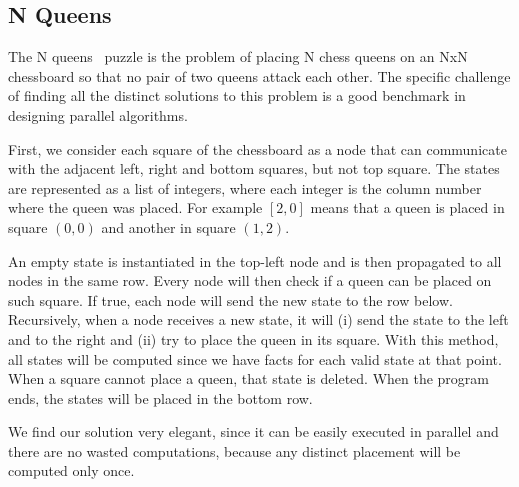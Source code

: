 \subsection{N Queens}

The N queens~\cite{8queens} puzzle is the problem of placing N chess queens on an NxN chessboard so
that no pair of two queens attack each other. The specific challenge of finding all the distinct
solutions to this problem is a good benchmark in designing parallel algorithms.

First, we consider each square of the chessboard as a node
that can communicate with the adjacent left, right and bottom squares, but not top square.
The states are represented as a list of integers, where each integer is the column number where
the queen was placed. For example $[2, 0]$ means that a queen is placed in square $(0, 0)$ and another in square $(1, 2)$.

An empty state is instantiated in the top-left node and is then propagated to all nodes in the same row.
Every node will then check if a queen can be placed on such square. If true, each node will send the new
state to the row below.
Recursively, when a node receives a new state, it will (i) send the state to the left
and to the right and (ii) try to place the queen in its square. With this method,
all states will be computed since we have facts for each valid state
at that point. When a square cannot place a queen, that state is deleted.
When the program ends, the states will be placed in the bottom row.

We find our solution very elegant, since it can be easily executed in parallel and there are no
wasted computations, because any distinct placement will be computed only once.

